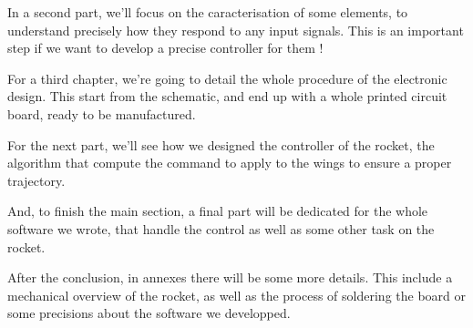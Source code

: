 In a second part, we'll focus on the caracterisation of some elements, to understand precisely how they respond to
any input signals. This is an important step if we want to develop a precise controller for them !

For a third chapter, we're going to detail the whole procedure of the electronic design. This start from the schematic,
and end up with a whole printed circuit board, ready to be manufactured.

For the next part, we'll see how we designed the controller of the rocket, the algorithm that compute the command to apply
to the wings to ensure a proper trajectory.

And, to finish the main section, a final part will be dedicated for the whole software we wrote, that handle the control as
well as some other task on the rocket.

After the conclusion, in annexes there will be some more details. This include a mechanical overview of the rocket, as well as
the process of soldering the board or some precisions about the software we developped.

